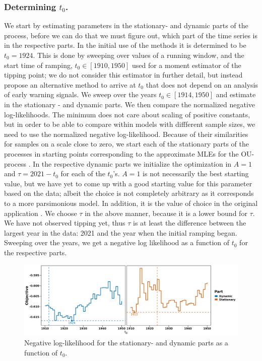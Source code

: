 \subsubsection{Determining $t_0$.}
We start by estimating parameters in the stationary- and dynamic parts of the process, before we can do that we must figure out, which part of the time series is in the respective parts. In the initial use of the methods it is determined to be $t_0 = 1924$. This is done by sweeping over values of a running window, and the start time of ramping, $t_0 \in [1910, 1950]$ used for a moment estimator of the tipping point; we do not consider this estimator in further detail, but instead propose an alternative method to arrive at $t_0$ that does not depend on an analysis of early warning signals. We sweep over the years $t_0 \in [1914, 1950]$ and estimate in the stationary - and dynamic parts. We then compare the normalized negative log-likelihoods. The minimum does not care about scaling of positive constants, but in order to be able to compare within models with diffferent sample sizes, we need to use the normalized negative log-likelihood. Because of their similarities for samples on a scale close to zero, we start each of the stationary parts of the processes in starting points corresponding to the approximate MLEs for the OU-process \cite[equation (S4-S6)]{DitlevsenSupplementary}. In the respective dynamic parts we initialize the optimization in $A = 1$ and $\tau = 2021 - t_0$ for each of the $t_0$'s. $A = 1$ is not necessarily the best starting value, but we have yet to come up with a good starting value for this parameter based on the data; albeit the choice is not completely arbitrary as it corresponds to a more parsimonious model. In addition, it is the value of choice in the original application \cite{Ditlevsen2023}. We choose $\tau$ in the above manner, because it is a lower bound for $\tau$. We have not observed tipping yet, thus $\tau$ is at least the difference between the largest year in the data: 2021 and the year when the initial ramping began. Sweeping over the years, we get a negative log likelihood as a function of $t_0$ for the respective parts.
\begin{figure}[h!]
    \begin{center}
    \includegraphics[scale = .095]{figures/ramping_year_likelihood_plot.jpeg}
    \caption{Negative log-likelihood for the stationary- and dynamic parts as a function of $t_0$.}
    \label{figure:negLoglikRamping}        
    \end{center}
\end{figure}\\
